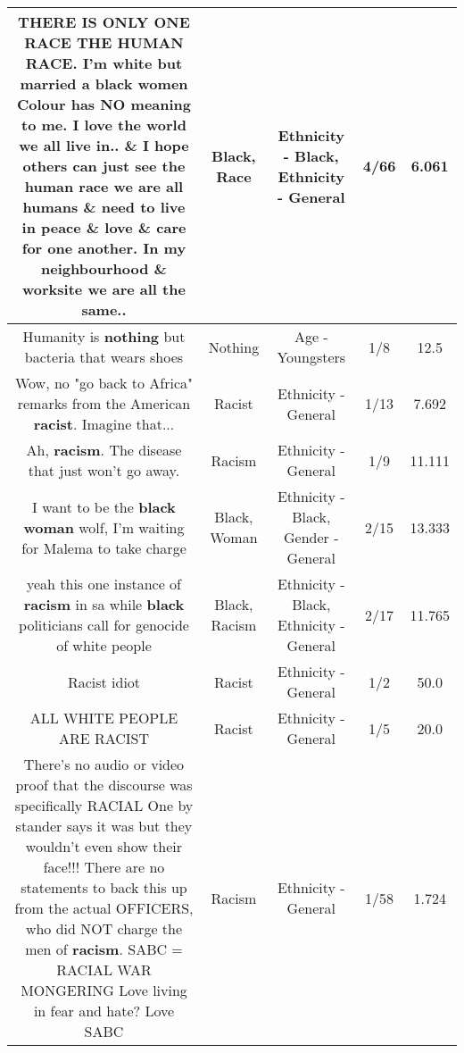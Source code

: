 \documentclass[11pt]{article}
\newlength\mylength
\begin{document}
\begin{center}
\begin{longtable}{|C{.65\mylength}|C{.30\mylength}|C{.12\mylength}|C{.12\mylength}|C{.12\mylength}|}
  \small THERE IS ONLY ONE \textbf{RACE} THE HUMAN \textbf{RACE}. I'm white but married a \textbf{black} women Colour has NO meaning to me. I love the world we all live in.. \& I hope others can just see the human \textbf{race} we are all humans \& need to live in peace \& love \& care for one another. In my neighbourhood \& worksite we are all the same..\normalsize   & Black, Race & Ethnicity - Black, Ethnicity - General & 4/66 & 6.061 \\  \hline
  \small Humanity is \textbf{nothing} but bacteria that wears shoes\normalsize   & Nothing & Age - Youngsters & 1/8 & 12.5 \\  \hline
  \small Wow, no "go back to Africa" remarks from the American \textbf{racist}. Imagine that...\normalsize   & Racist & Ethnicity - General & 1/13 & 7.692 \\  \hline
  \small Ah, \textbf{racism}. The disease that just won't go away.\normalsize   & Racism & Ethnicity - General & 1/9 & 11.111 \\  \hline
  \small I want to be the \textbf{black} \textbf{woman} wolf, I'm waiting for Malema to take charge\normalsize   & Black, Woman & Ethnicity - Black, Gender - General & 2/15 & 13.333 \\  \hline
  \small yeah this one instance of \textbf{racism} in sa while \textbf{black} politicians call for genocide of white people\normalsize   & Black, Racism & Ethnicity - Black, Ethnicity - General & 2/17 & 11.765 \\  \hline
  \small Racist idiot\normalsize   & Racist & Ethnicity - General & 1/2 & 50.0 \\  \hline
  \small ALL WHITE PEOPLE ARE RACIST\normalsize   & Racist & Ethnicity - General & 1/5 & 20.0 \\  \hline
  \small There's no audio or video proof that the discourse was specifically RACIAL One by stander says it was but they wouldn't even show their face!!! There are no statements to back this up from the actual OFFICERS, who did NOT charge the men of \textbf{racism}. SABC = RACIAL WAR MONGERING   Love living in fear and hate? Love SABC\normalsize   & Racism & Ethnicity - General & 1/58 & 1.724 \\  \hline

\end{longtable}
\end{center}
\end{document}
